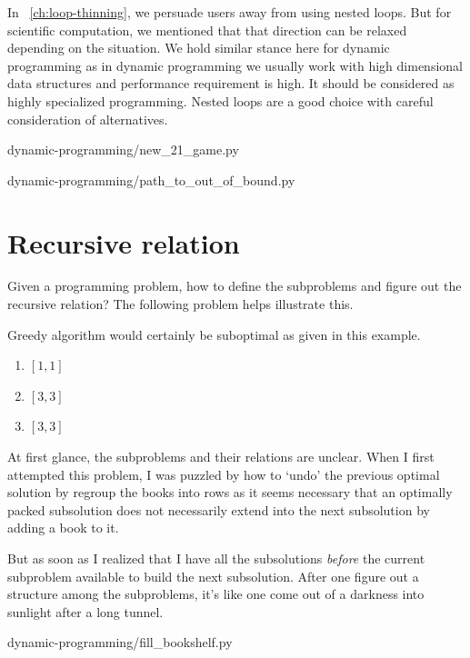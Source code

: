 \documentclass[oneside,11pt]{book}
\theoremstyle{definition}
\theoremstyle{remark}
\begin{document}
In ~\autoref{ch:loop-thinning}, we persuade users away from using nested loops.
But for scientific computation, we mentioned that that direction can be relaxed depending on the
situation.
We hold similar stance here for dynamic programming as in dynamic programming we usually work
with high dimensional data structures and performance requirement is high.
It should be considered as highly specialized programming.
Nested loops are a good choice with careful consideration of alternatives.

\begin{clisting}
    
    {dynamic-programming/new_21_game.py}
\end{clisting}

\begin{clisting}
    
    {dynamic-programming/path_to_out_of_bound.py}
\end{clisting}

\section{Recursive relation}\label{sec:recursive-relation}

Given a programming problem, how to define the subproblems and figure out the recursive relation?
The following problem helps illustrate this.

Greedy algorithm would certainly be suboptimal as given in this example.
\begin{enumerate}
    \item $[1, 1]$
    \item $[3, 3]$
    \item $[3, 3]$
\end{enumerate}

At first glance, the subproblems and their relations are unclear.
When I first attempted this problem, I was puzzled by how to `undo' the previous optimal solution
by regroup the books into rows as it seems necessary that an optimally packed subsolution does
not necessarily extend into the next subsolution by adding a book to it.

But as soon as I realized that I have all the subsolutions \emph{before} the current subproblem
available to build the next subsolution.
After one figure out a structure among the subproblems, it's like one come out of a darkness
into sunlight after a long tunnel.
\begin{clisting}
    
    {dynamic-programming/fill_bookshelf.py}
\end{clisting}
\end{document}
